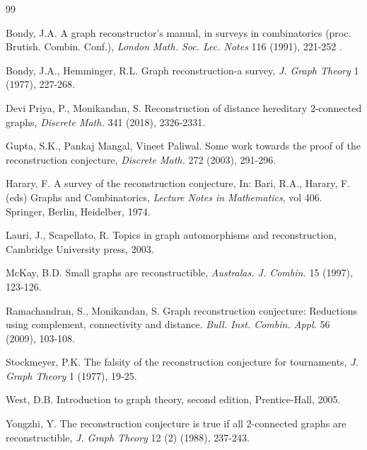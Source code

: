 \documentclass[11pt,oneside]{article}
\theoremstyle{definition}
\begin{document}
\begin{thebibliography}{99}

 Bondy, J.A. A graph reconstructor's manual, in surveys in combinatorics (proc. Brutish. Combin. Conf.), {\it London Math. Soc. Lec. Notes} 116  (1991), 221-252 . 

 Bondy, J.A., Hemminger, R.L. Graph reconstruction-a survey, {\it J. Graph Theory} 1  (1977), 227-268.  

 Devi Priya, P., Monikandan, S. Reconstruction of distance hereditary 2-connected graphs, {\it Discrete Math.} 341  (2018), 2326-2331. 

 Gupta, S.K., Pankaj Mangal, Vineet Paliwal. Some work towards the proof of the reconstruction conjecture, {\it Discrete Math.} 272  (2003), 291-296. 

 Harary, F. A survey of the reconstruction conjecture, In: Bari, R.A., Harary, F. (eds) Graphs and Combinatorics, {\it Lecture Notes in Mathematics}, vol 406. Springer, Berlin, Heidelber, 1974. 

 Lauri, J., Scapellato, R. Topics in graph automorphisms and reconstruction, Cambridge University press, 2003.

 McKay, B.D. Small graphs are reconstructible, {\it Australas. J. Combin.} 15  (1997), 123-126. 
 
 Ramachandran, S., Monikandan, S. Graph reconstruction conjecture: Reductions using complement, connectivity and distance. {\it Bull. Inst. Combin. Appl.} 56  (2009), 103-108. 

 Stockmeyer, P.K. The falsity of the reconstruction conjecture for tournaments, {\it J. Graph Theory} 1  (1977), 19-25.  

 West, D.B. Introduction to graph theory, second edition,  Prentice-Hall, 2005.

 Yongzhi, Y. The reconstruction conjecture is true if all 2-connected graphs are reconstructible, {\it J. Graph Theory} 12 (2)  (1988), 237-243.  
\end{thebibliography}
\end{document}
